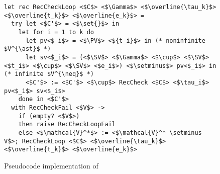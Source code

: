 \begin{figure}
\centering

\begin{verbatim}
let rec RecCheckLoop <$C$> <$\Gamma$> <$\overline{\tau_k}$> <$\overline{t_k}$> <$\overline{e_k}$> =
  try let <$C'$> = <$\set{}$> in
    let for i = 1 to k do
      let pv<$_i$> = <$\PV$> <${t_i}$> in (* noninfinite $V^{\ast}$ *)
      let sv<$_i$> = (<$\SV$> <$\Gamma$> <$\cup$> <$\SV$> <$t_i$> <$\cup$> <$\SV$> <$e_i$>) <$\setminus$> pv<$_i$> in (* infinite $V^{\neq}$ *)
      <$C'$> := <$C'$> <$\cup$> RecCheck <$C$> <$\tau_i$> pv<$_i$> sv<$_i$>
    done in <$C'$>
  with RecCheckFail <$V$> ->
    if (empty? <$V$>)
    then raise RecCheckLoopFail
    else <$\mathcal{V}^*$> := <$\mathcal{V}^* \setminus V$>; RecCheckLoop <$C$> <$\overline{\tau_k}$> <$\overline{t_k}$> <$\overline{e_k}$>
\end{verbatim}

\caption{Pseudocode implementation of \RecCheckLoop}
\label{fig:helpers}
\end{figure}

